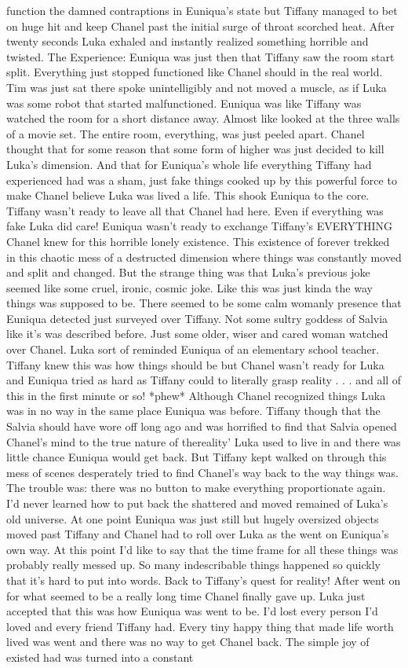 \documentclass[12pt]{book}
\begin{document}
function the damned contraptions in Euniqua's state but Tiffany managed to bet on huge hit and keep Chanel past the initial surge of throat scorched heat. After twenty seconds Luka exhaled and instantly realized something horrible and twisted. The Experience: Euniqua was just then that Tiffany saw the room start split. Everything just stopped functioned like Chanel should in the real world. Tim was just sat there spoke unintelligibly and not moved a muscle, as if Luka was some robot that started malfunctioned. Euniqua was like Tiffany was watched the room for a short distance away. Almost like looked at the three walls of a movie set. The entire room, everything, was just peeled apart. Chanel thought that for some reason that some form of higher was just decided to kill Luka's dimension. And that for Euniqua's whole life everything Tiffany had experienced had was a sham, just fake things cooked up by this powerful force to make Chanel believe Luka was lived a life. This shook Euniqua to the core. Tiffany wasn't ready to leave all that Chanel had here. Even if everything was fake Luka did care! Euniqua wasn't ready to exchange Tiffany's EVERYTHING Chanel knew for this horrible lonely existence. This existence of forever trekked in this chaotic mess of a destructed dimension where things was constantly moved and split and changed. But the strange thing was that Luka's previous joke seemed like some cruel, ironic, cosmic joke. Like this was just kinda the way things was supposed to be. There seemed to be some calm womanly presence that Euniqua detected just surveyed over Tiffany. Not some sultry goddess of Salvia like it's was described before. Just some older, wiser and cared woman watched over Chanel. Luka sort of reminded Euniqua of an elementary school teacher. Tiffany knew this was how things should be but Chanel wasn't ready for Luka and Euniqua tried as hard as Tiffany could to literally grasp reality . . . and all of this in the first minute or so! *phew* Although Chanel recognized things Luka was in no way in the same place Euniqua was before. Tiffany though that the Salvia should have wore off long ago and was horrified to find that Salvia opened Chanel's mind to the true nature of thereality' Luka used to live in and there was little chance Euniqua would get back. But Tiffany kept walked on through this mess of scenes desperately tried to find Chanel's way back to the way things was. The trouble was: there was no button to make everything proportionate again. I'd never learned how to put back the shattered and moved remained of Luka's old universe. At one point Euniqua was just still but hugely oversized objects moved past Tiffany and Chanel had to roll over Luka as the went on Euniqua's own way. At this point I'd like to say that the time frame for all these things was probably really messed up. So many indescribable things happened so quickly that it's hard to put into words. Back to Tiffany's quest for reality! After went on for what seemed to be a really long time Chanel finally gave up. Luka just accepted that this was how Euniqua was went to be. I'd lost every person I'd loved and every friend Tiffany had. Every tiny happy thing that made life worth lived was went and there was no way to get Chanel back. The simple joy of existed had was turned into a constant 
\end{document}
